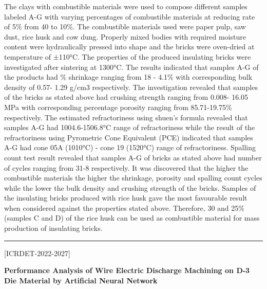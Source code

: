 \documentclass[twoside,11pt]{amsart}
\begin{document}
The clays with combustible materials were
used to compose different samples labeled A-G with varying percentages of combustible materials at
reducing rate of 5\% from 40 to 10\%. The combustible materials used were paper pulp, saw dust, rice husk
and cow dung. Properly mixed bodies with required moisture content were hydraulically pressed into shape
and the bricks were oven-dried at temperature of ±110°C. The properties of the produced insulating bricks
were investigated after sintering at 1300°C. The results indicated that samples A-G of the products had \%
shrinkage ranging from 18 - 4.1\% with corresponding bulk density of 0.57- 1.29 g/cm3 respectively. The
investigation revealed that samples of the bricks as stated above had crushing strength ranging from 0.008-
16.05 MPa with corresponding percentage porosity ranging from 85.71-19.75\% respectively. The estimated
refractoriness using shuen’s formula revealed that samples A-G had 1004.6-1506.8°C range of
refractoriness while the result of the refractoriness using Pyrometric Cone Equivalent (PCE) indicated that
samples A-G had cone 05A (1010°C) - cone 19 (1520°C) range of refractoriness. Spalling count test result
revealed that samples A-G of bricks as stated above had number of cycles ranging from 31-8 respectively. It
was discovered that the higher the combustible materials the higher the shrinkage, porosity and spalling
count cycles while the lower the bulk density and crushing strength of the bricks. Samples of the insulating
bricks produced with rice husk gave the most favourable result when considered against the properties
stated above. Therefore, 30 and 25\% (samples C and D) of the rice husk can be used as combustible
material for mass production of insulating bricks.
\vskip 2mm
\rule{\textwidth}{0.5pt}
\vskip 5mm
\begin{flushleft}
\centerline{[ICRDET-2022-2027]}
\end{flushleft}
\begin{center}\bf\LARGE
Performance Analysis of Wire Electric Discharge Machining on D-3 Die Material by Artificial Neural Network
\end{center}
\vskip 5mm
\end{document}
